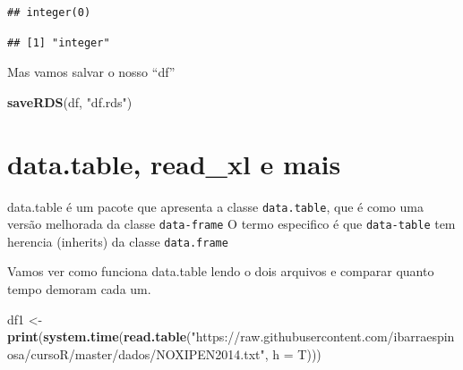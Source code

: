 \documentclass[]{book}
\newenvironment{Shaded}{\begin{snugshade}}{\end{snugshade}}
\newcommand{\KeywordTok}[1]{\textcolor[rgb]{0.13,0.29,0.53}{\textbf{#1}}}
\newcommand{\DataTypeTok}[1]{\textcolor[rgb]{0.13,0.29,0.53}{#1}}
\newcommand{\StringTok}[1]{\textcolor[rgb]{0.31,0.60,0.02}{#1}}
\newcommand{\OperatorTok}[1]{\textcolor[rgb]{0.81,0.36,0.00}{\textbf{#1}}}
\newcommand{\NormalTok}[1]{#1}
\begin{document}
\begin{Shaded}
\end{Shaded}

\begin{verbatim}
## integer(0)
\end{verbatim}

\begin{Shaded}
\end{Shaded}

\begin{verbatim}
## [1] "integer"
\end{verbatim}

Mas vamos salvar o nosso ``df''

\begin{Shaded}
\begin{Highlighting}[]
\KeywordTok{saveRDS}\NormalTok{(df, }\StringTok{"df.rds"}\NormalTok{)}
\end{Highlighting}
\end{Shaded}

\section{data.table, read\_xl e mais}\label{data.table-read_xl-e-mais}

data.table é um pacote que apresenta a classe \texttt{data.table}, que é
como uma versão melhorada da classe \texttt{data-frame} O termo
especifico é que \texttt{data-table} tem herencia (inherits) da classe
\texttt{data.frame}

Vamos ver como funciona data.table lendo o dois arquivos e comparar
quanto tempo demoram cada um.

\begin{Shaded}
\begin{Highlighting}[]
\NormalTok{df1 <-}\StringTok{ }\KeywordTok{print}\NormalTok{(}\KeywordTok{system.time}\NormalTok{(}\KeywordTok{read.table}\NormalTok{(}\StringTok{"https://raw.githubusercontent.com/ibarraespinosa/cursoR/master/dados/NOXIPEN2014.txt"}\NormalTok{, }\DataTypeTok{h =}\NormalTok{ T)))}
\end{Highlighting}
\end{Shaded}
\end{document}
